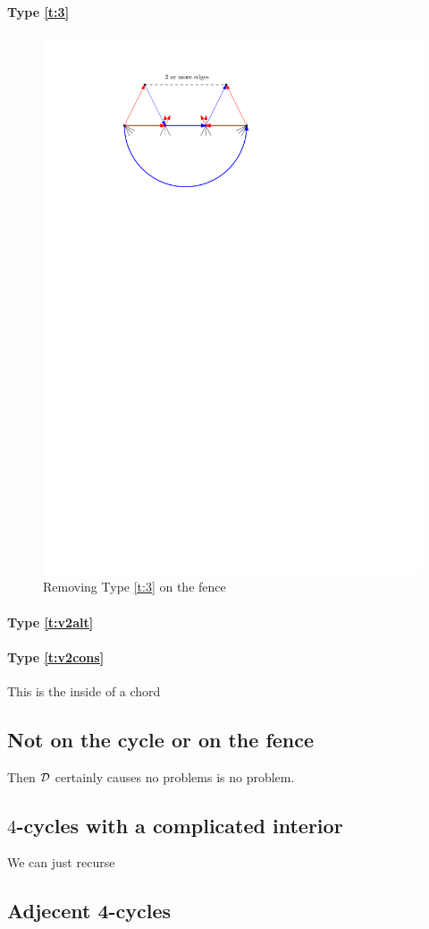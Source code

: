   \paragraph{Type \ref{t:3}}

  \begin{figure}[h]
    \centering
    \includegraphics[scale=1]{4cycles/img/fence_d}
    \caption{Removing Type \ref{t:3} on the fence}
    \label{fig:4c:fence_d}
  \end{figure}

  \paragraph{Type \ref{t:v2alt}}


  \paragraph{Type \ref{t:v2cons}}
    This is the inside of a chord

\subsection{Not on the cycle or on the fence}
  Then $\mathcal{D}$ certainly causes no problems  is no problem.

\subsection{$4$-cycles with a complicated interior}
  We can just recurse

\subsection{Adjecent 4-cycles}
